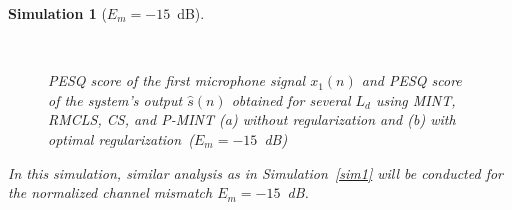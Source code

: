 \documentclass[10pt]{IEEEtran}
\newtheorem{simulation}{Simulation}
\begin{document}
\begin{simulation}[$E_m=-15$~dB]
\label{sim2}
\begin{figure}[b!]
\centering
\hbox{
}
\caption{PESQ score of the first microphone signal $x_1(n)$ and PESQ score of the system's output $\hat{s}(n)$ obtained for several $L_d$ using MINT, RMCLS, CS, and P-MINT (a) without regularization and (b) with optimal regularization~($E_m = -15$~dB)}
\end{figure}
In this simulation, similar analysis as in Simulation~\ref{sim1} will be conducted for the normalized channel mismatch $E_m = -15$~dB.

\end{simulation}
\end{document}
